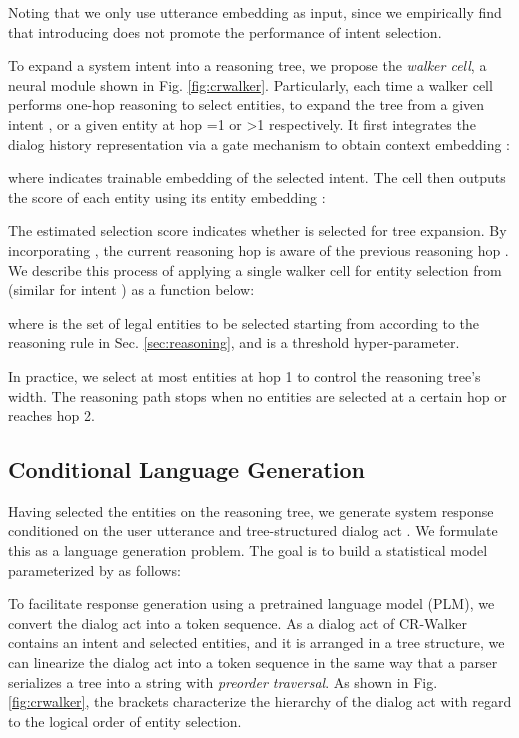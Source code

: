\documentclass[11pt]{article}
\begin{document}
Noting that we only use utterance embedding  as input, since we empirically find that introducing  does not promote the performance of intent selection.

To expand a system intent into a reasoning tree, we propose the \textit{walker cell}, a neural module shown in Fig. \ref{fig:crwalker}. Particularly, each time a walker cell  performs one-hop reasoning to select entities, to expand the tree from a given intent , or a given entity  at hop =1 or >1 respectively. It first integrates the dialog history representation via a gate mechanism to obtain context embedding :

where  indicates trainable embedding of the selected intent. The cell then outputs the score of each entity  using its entity embedding :

The estimated selection score  indicates whether  is selected for tree expansion. By incorporating , the current reasoning hop  is aware of the previous reasoning hop . We describe this process of applying a single walker cell for entity selection from  (similar for intent ) as a function below:

where  is the set of legal entities to be selected starting from  according to the reasoning rule in Sec. \ref{sec:reasoning}, and  is a threshold hyper-parameter. 

In practice, we select at most  entities at hop 1 to control the reasoning tree's width. The reasoning path stops when no entities are selected at a certain hop or reaches hop 2. 


\subsection{Conditional Language Generation}
Having selected the entities on the reasoning tree, we generate system response  conditioned on the user utterance  and tree-structured dialog act . We formulate this as a language generation problem. The goal is to build a statistical model parameterized by  as follows: 





To facilitate response generation using a pretrained language model (PLM), we convert the dialog act into a token sequence. As a dialog act of CR-Walker contains an intent and selected entities, and it is arranged in a tree structure, we can linearize the dialog act into a token sequence in the same way that a parser serializes a tree into a string with \textit{preorder traversal}.  As shown in Fig. \ref{fig:crwalker}, the brackets characterize the hierarchy of the dialog act 
with regard to the logical order of entity selection.
\end{document}
